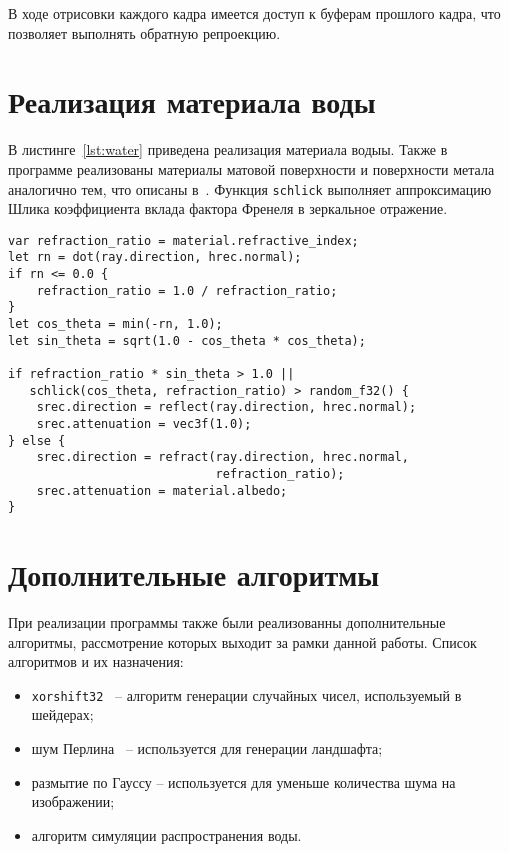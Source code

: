 В ходе отрисовки каждого кадра имеется доступ к буферам прошлого кадра,
что позволяет выполнять обратную репроекцию.

\section{Реализация материала воды}

В листинге~\ref{lst:water} приведена реализация материала водыы. Также в программе реализованы
материалы матовой поверхности и поверхности метала аналогично тем, что описаны в~\cite{RTW}.
Функция \verb|schlick| выполняет аппроксимацию Шлика коэффициента вклада фактора Френеля в 
зеркальное отражение.

\begin{lstlisting}[caption={Реализация материала воды},label={lst:water},frame=single]
var refraction_ratio = material.refractive_index;
let rn = dot(ray.direction, hrec.normal);
if rn <= 0.0 {
    refraction_ratio = 1.0 / refraction_ratio;
}
let cos_theta = min(-rn, 1.0);
let sin_theta = sqrt(1.0 - cos_theta * cos_theta);

if refraction_ratio * sin_theta > 1.0 || 
   schlick(cos_theta, refraction_ratio) > random_f32() {
    srec.direction = reflect(ray.direction, hrec.normal);
    srec.attenuation = vec3f(1.0);
} else {
    srec.direction = refract(ray.direction, hrec.normal, 
                             refraction_ratio);
    srec.attenuation = material.albedo;
}
\end{lstlisting}

\section{Дополнительные алгоритмы}

При реализации программы также были реализованны дополнительные алгоритмы, рассмотрение 
которых выходит за рамки данной работы. Список алгоритмов и их назначения:
\begin{itemize}
    \item \verb|xorshift32|~\cite{xorshift} -- алгоритм генерации случайных чисел, используемый в шейдерах;
    \item шум Перлина~\cite{perlin} -- используется для генерации ландшафта;
    \item размытие по Гауссу -- используется для уменьше количества шума на изображении;
    \item алгоритм симуляции распространения воды.
\end{itemize}

